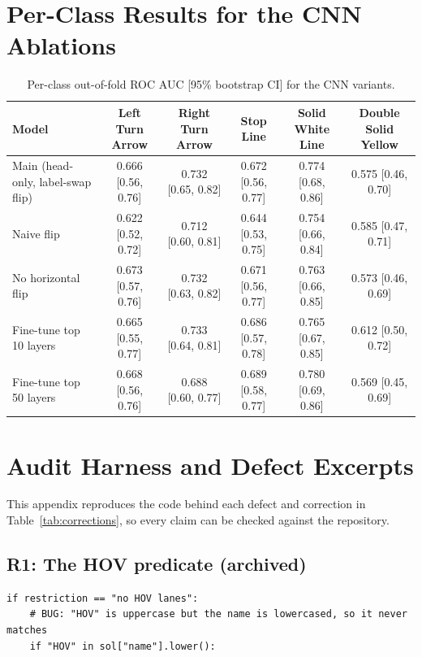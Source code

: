 \documentclass[11pt]{article}
\begin{document}
\section{Per-Class Results for the CNN Ablations}
\begin{table}[!htbp]
\centering\small
\caption{Per-class out-of-fold ROC AUC [95\% bootstrap CI] for the CNN variants.}
\label{tab:ablation-perclass}
\footnotesize\setlength{\tabcolsep}{5pt}
\begin{adjustbox}{max width=\textwidth}
\begin{tabular}{P{0.19\textwidth}ccccc}
\toprule
Model & Left Turn Arrow & Right Turn Arrow & Stop Line & Solid White Line & Double Solid Yellow \\
\midrule
Main (head-only, label-swap flip) & 0.666 [0.56, 0.76] & 0.732 [0.65, 0.82] & 0.672 [0.56, 0.77] & 0.774 [0.68, 0.86] & 0.575 [0.46, 0.70] \\
Naive flip & 0.622 [0.52, 0.72] & 0.712 [0.60, 0.81] & 0.644 [0.53, 0.75] & 0.754 [0.66, 0.84] & 0.585 [0.47, 0.71] \\
No horizontal flip & 0.673 [0.57, 0.76] & 0.732 [0.63, 0.82] & 0.671 [0.56, 0.77] & 0.763 [0.66, 0.85] & 0.573 [0.46, 0.69] \\
Fine-tune top 10 layers & 0.665 [0.55, 0.77] & 0.733 [0.64, 0.81] & 0.686 [0.57, 0.78] & 0.765 [0.67, 0.85] & 0.612 [0.50, 0.72] \\
Fine-tune top 50 layers & 0.668 [0.56, 0.76] & 0.688 [0.60, 0.77] & 0.689 [0.58, 0.77] & 0.780 [0.69, 0.86] & 0.569 [0.45, 0.69] \\
\bottomrule
\end{tabular}
\end{adjustbox}
\end{table}

\clearpage
\section{Audit Harness and Defect Excerpts}
\label{app:harness}

This appendix reproduces the code behind each defect and correction in Table~\ref{tab:corrections}, so every claim can be checked against the repository.

\subsection{R1: The HOV predicate (archived)}
\begin{lstlisting}[caption={Archived HOV predicate. The uppercase needle never matches a lowercased name, so the restriction is a no-op.},label={lst:hov}]
if restriction == "no HOV lanes":
    # BUG: "HOV" is uppercase but the name is lowercased, so it never matches
    if "HOV" in sol["name"].lower():
\end{lstlisting}
\end{document}
